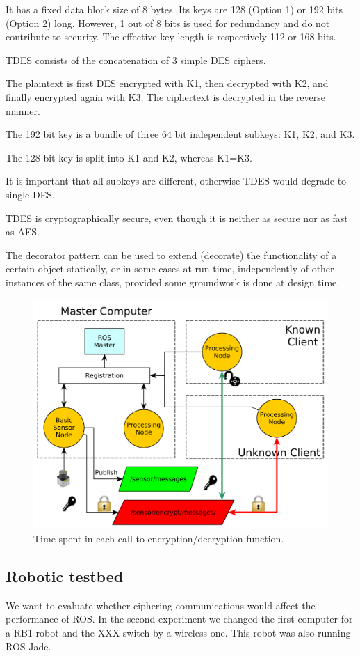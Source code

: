 \documentclass[journal,twoside]{JoPhA}
\begin{document}
It has a fixed data block size of 8 bytes. Its keys are 128 (Option 1) or 192 bits (Option 2) long. However, 1 out of 8 bits is used for redundancy and do not contribute to security. The effective key length is respectively 112 or 168 bits.

TDES consists of the concatenation of 3 simple DES ciphers.

The plaintext is first DES encrypted with K1, then decrypted with K2, and finally encrypted again with K3. The ciphertext is decrypted in the reverse manner.

The 192 bit key is a bundle of three 64 bit independent subkeys: K1, K2, and K3.

The 128 bit key is split into K1 and K2, whereas K1=K3.

It is important that all subkeys are different, otherwise TDES would degrade to single DES.

TDES is cryptographically secure, even though it is neither as secure nor as fast as AES.


The decorator pattern can be used to extend (decorate) the functionality of a certain object statically, or in some cases at run-time, independently of other instances of the same class, provided some groundwork is done at design time. 

\begin{figure}[ht]
    \centering
    \includegraphics[width=.5\textwidth]{TestBed.pdf}
    \caption{Time spent in each call to encryption/decryption function.}
  \label{fig:TestBed}
\end{figure}




\subsection{Robotic testbed}

We want to evaluate whether ciphering communications would affect the performance of ROS. 
In the second experiment we changed the first computer for a RB1 robot and the XXX switch by a wireless one. This robot was also running ROS Jade.
\end{document}
